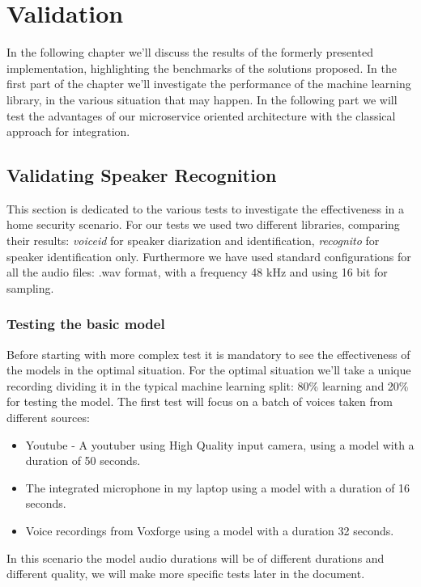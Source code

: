 \chapter{Validation}

In the following chapter we'll discuss the results of the formerly
presented implementation, highlighting the benchmarks of the solutions proposed.
In the first part of the chapter we'll investigate the performance of the machine learning
library, in the various situation that may happen. In the following part we will
test the advantages of our microservice oriented architecture with the classical approach
for integration.

\section{Validating Speaker Recognition}

This section is dedicated to the various tests to investigate
the effectiveness in a home security scenario. For our
tests we used two different libraries, comparing their results:
\textit{voiceid} for speaker diarization and identification, \textit{recognito}
for speaker identification only. Furthermore we have used standard configurations
for all the audio files: .wav format, with a frequency 48 kHz and using 16 bit for sampling.

\subsection{Testing the basic model}

Before starting with more complex test it is mandatory to see the effectiveness
of the models in the optimal situation. For the optimal situation we'll take
a unique recording dividing it in the typical machine learning split: 80\% learning
and 20\% for testing the model.\newline
The first test will focus on a batch of voices taken from different sources:

\begin{itemize}
    \item Youtube -  A youtuber using High Quality input camera, using a model with a duration of 50 seconds.
    \item The integrated microphone in my laptop using a model with a duration of 16 seconds.
    \item Voice recordings from Voxforge using a model with a duration 32 seconds.
\end{itemize}
In this scenario the model audio durations will be of different durations and different
quality, we will make more specific tests later in the document.

